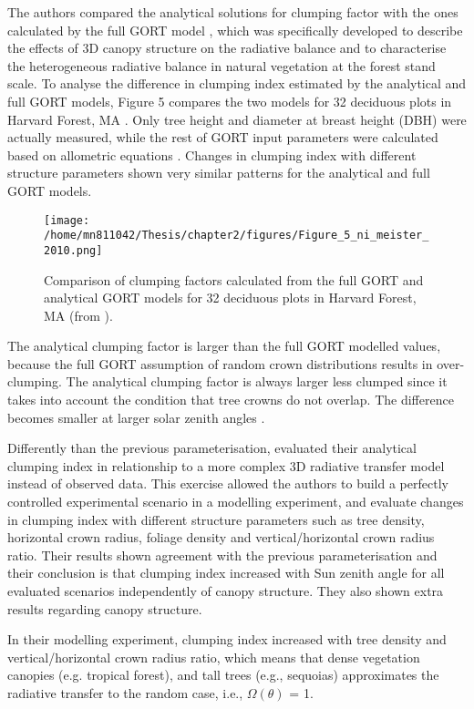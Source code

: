 The authors compared the analytical solutions for clumping factor with the ones calculated by the full GORT model \citep{Li1995}, which was specifically developed to describe the effects of 3D canopy structure on the radiative balance and to characterise the heterogeneous radiative balance in natural vegetation at the forest stand scale. 
To analyse the difference in clumping index estimated by the analytical and full GORT models, Figure 5 compares the two models for 32 deciduous plots in Harvard Forest, MA \citep{Barford2001}. Only tree height and diameter at breast height (DBH) were actually measured, while the rest of GORT input parameters were calculated based on allometric equations \citep{Ni-Meister2010}. Changes in clumping index with different structure parameters shown very similar patterns for the analytical and full GORT models. 

\begin{figure}[ht!]
\centering
\texttt{[image: /home/mn811042/Thesis/chapter2/figures/Figure\_5\_ni\_meister\_2010.png]}
\caption{Comparison of clumping factors calculated from the full GORT and analytical GORT models for 32 deciduous plots in Harvard Forest, MA (from \citet{Ni-Meister2010}).}
\label{f:ni-meister}
\end{figure}

The analytical clumping factor is larger than the full GORT modelled values, because the full GORT assumption of random crown distributions results in over-clumping. The analytical clumping factor is always larger  less clumped  since it takes into account the condition that tree crowns do not overlap. The difference becomes smaller at larger solar zenith angles \citep{Ni-Meister2010}.

Differently than the previous parameterisation, \citet{Ni-Meister2010} evaluated their analytical clumping index in relationship to a more complex 3D radiative transfer model instead of observed data. This exercise allowed the authors to build a perfectly controlled experimental scenario in a modelling experiment, and evaluate changes in clumping index with different structure parameters such as tree density, horizontal crown radius, foliage density and vertical/horizontal crown radius ratio. Their results shown agreement with the previous parameterisation and their conclusion is that clumping index increased with Sun zenith angle for all evaluated scenarios independently of canopy structure. They also shown extra results regarding canopy structure. 

In their modelling experiment, clumping index increased with tree density and vertical/horizontal crown radius ratio, which means that dense vegetation canopies (e.g. tropical forest), and tall trees (e.g., sequoias) approximates the radiative transfer to the random case, i.e., $\Omega(\theta)$ = 1. 

